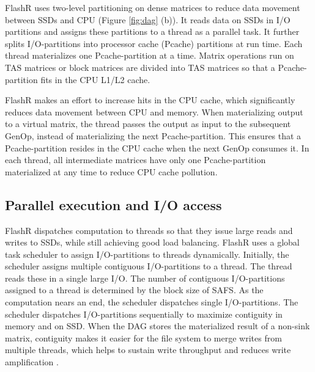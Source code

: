 FlashR uses two-level partitioning on dense matrices to reduce data movement
between SSDs and CPU (Figure \ref{fig:dag} (b)). It reads data on SSDs in
I/O partitions and assigns these partitions to a thread as a parallel task.
It further splits I/O-partitions into processor cache (Pcache)
partitions at run time.  Each thread materializes one Pcache-partition
at a time. Matrix operations run on TAS matrices or block matrices are
divided into TAS matrices so that a Pcache-partition fits in the CPU L1/L2 cache.

FlashR makes an effort to increase hits in the CPU cache, which
significantly reduces data movement between CPU and memory.
When materializing output to a virtual matrix, the thread passes
the output as input to the subsequent
GenOp, instead of materializing the next Pcache-partition.
This ensures that a Pcache-partition resides in the CPU cache
when the next GenOp consumes it. 
In each thread, all intermediate matrices have only one 
Pcache-partition materialized
at any time to reduce CPU cache pollution.




\subsection{Parallel execution and I/O access}
FlashR dispatches computation to threads so that they
issue large reads and writes to SSDs, while still achieving good load balancing.
FlashR uses a global task scheduler to assign I/O-partitions to threads
dynamically. Initially, the scheduler assigns multiple contiguous I/O-partitions
to a thread. The thread reads these in a single large I/O.
The number of contiguous I/O-partitions assigned to a thread is determined by
the block size of SAFS.
As the computation nears an end, the scheduler dispatches single I/O-partitions. 
The scheduler dispatches I/O-partitions sequentially to maximize contiguity in memory
and on SSD. When the DAG stores the materialized result of a non-sink matrix,
contiguity makes it easier for the file system to merge
writes from multiple threads, which helps to sustain write throughput and reduces
write amplification \cite{ripq}.

